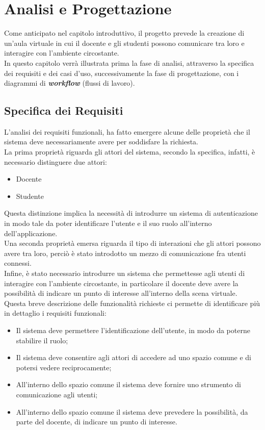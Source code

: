 \chapter{Analisi e Progettazione}
Come anticipato nel capitolo introduttivo, il progetto prevede la creazione di un'aula virtuale in cui il docente e gli studenti possono comunicare tra loro e interagire con l'ambiente circostante.
\\In questo capitolo verrà illustrata prima la fase di analisi, attraverso la specifica dei requisiti e dei casi d'uso, successivamente la fase di progettazione, con i diagrammi di \textbf{\textit{workflow}} (flussi di lavoro).
\section{Specifica dei Requisiti}
L'analisi dei requisiti funzionali, ha fatto emergere alcune delle proprietà che il sistema deve necessariamente avere per soddisfare la richiesta.
\\La prima proprietà riguarda gli attori del sistema, secondo la specifica, infatti, è necessario distinguere due attori:
\begin{itemize}
    \item Docente
    \item Studente
\end{itemize} 
Questa distinzione implica la necessità di introdurre un sistema di autenticazione
in modo tale da poter identificare l'utente e il suo ruolo all'interno
dell'applicazione.\\
Una seconda proprietà emersa riguarda il tipo di interazioni che gli attori
possono avere tra loro, perciò è stato introdotto un mezzo di comunicazione fra utenti connessi.
\\Infine, è stato necessario introdurre un sistema che permettesse agli utenti
di interagire con l'ambiente circostante, in particolare il docente deve avere la
possibilità di indicare un punto di interesse all'interno della scena virtuale.\\
Questa breve descrizione delle funzionalità richieste ci permette di identificare
più in dettaglio i requisiti funzionali:
\begin{itemize}
    \item Il sistema deve permettere l'identificazione dell'utente, in modo da poterne
     stabilire il ruolo; 
     \item Il sistema deve consentire agli attori di accedere ad uno spazio comune e
di potersi vedere reciprocamente;
     \item All'interno dello spazio comune il sistema deve fornire uno strumento di
comunicazione agli utenti;
     \item All'interno dello spazio comune il sistema deve prevedere la possibilità, da
parte del docente, di indicare un punto di interesse.
\end{itemize} 
